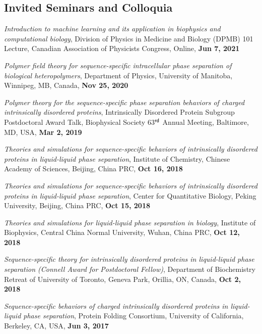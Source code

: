 \documentclass[11pt]{../yhlcv}
\begin{document}
\subsection*{Invited Seminars and Colloquia}

\begin{etaremune}[leftmargin=0.26in]

\item {\it Introduction to machine learning and its application in biophysics and computational biology}, Division of Physics in Medicine and Biology (DPMB) 101 Lecture, Canadian Association of Physicists Congress, Online, {\bf Jun 7, 2021}

\item {\it Polymer field theory for sequence-specific intracellular phase separation of biological heteropolymers}, Department of Physics, University of Manitoba, Winnipeg, MB, Canada, {\bf Nov 25, 2020}

\item {\it Polymer theory for the sequence-specific phase separation behaviors of charged intrinsically disordered proteins}, Intrinsically Disordered Protein Subgroup Postdoctoral Award Talk, Biophysical Society 63$^{\sf rd}$  Annual Meeting, Baltimore, MD, USA, {\bf Mar 2, 2019}

\item {\it Theories and simulations for sequence-specific behaviors of intrinsically disordered proteins in liquid-liquid phase separation}, Institute of Chemistry, Chinese Academy of Sciences, Beijing, China PRC, {\bf Oct 16, 2018}

\item {\it Theories and simulations for sequence-specific behaviors of intrinsically disordered proteins in liquid-liquid phase separation}, Center for Quantitative Biology, Peking University, Beijing, China PRC, {\bf Oct 15, 2018}

\item {\it Theories and simulations for liquid-liquid phase separation in biology}, Institute of Biophysics, Central China Normal University, Wuhan, China PRC, {\bf Oct 12, 2018}

\item {\it Sequence-specific theory for intrinsically disordered proteins in liquid-liquid phase separation (Connell Award for Postdoctoral Fellow)}, Department of Biochemistry Retreat of University of Toronto, Geneva Park, Orillia, ON, Canada, {\bf Oct 2, 2018}

\item {\it Sequence-specific behaviors of charged intrinsically disordered proteins
	in liquid-liquid phase separation}, Protein Folding Consortium, University of California, Berkeley, CA, USA, {\bf Jun 3, 2017}


\end{etaremune}
\end{document}
